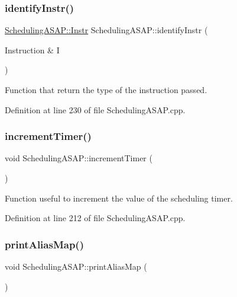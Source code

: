 \subsubsection{\texorpdfstring{identify\+Instr()}{identifyInstr()}}
{\footnotesize\ttfamily \hyperlink{classoctantis_1_1SchedulingASAP_abbd454a56c823d34f835168cc31168f4}{Scheduling\+A\+S\+A\+P\+::\+Instr} Scheduling\+A\+S\+A\+P\+::identify\+Instr (\begin{DoxyParamCaption}\item[{Instruction \&}]{I }\end{DoxyParamCaption})}



Function that return the type of the instruction passed. 



Definition at line 230 of file Scheduling\+A\+S\+A\+P.\+cpp.

\mbox{\label{classoctantis_1_1SchedulingASAP_a8b0a9d978d7b4276b1c741779a5e4191}} 
\subsubsection{\texorpdfstring{increment\+Timer()}{incrementTimer()}}
{\footnotesize\ttfamily void Scheduling\+A\+S\+A\+P\+::increment\+Timer (\begin{DoxyParamCaption}{ }\end{DoxyParamCaption})}



Function useful to increment the value of the scheduling timer. 



Definition at line 212 of file Scheduling\+A\+S\+A\+P.\+cpp.

\mbox{\label{classoctantis_1_1SchedulingASAP_ae3df036361ff37d74ca915487f1be0b4}} 
\subsubsection{\texorpdfstring{print\+Alias\+Map()}{printAliasMap()}}
{\footnotesize\ttfamily void Scheduling\+A\+S\+A\+P\+::print\+Alias\+Map (\begin{DoxyParamCaption}{ }\end{DoxyParamCaption})}



